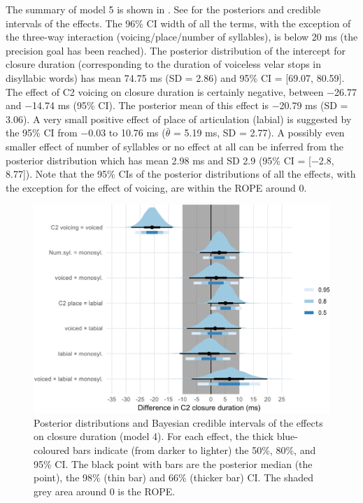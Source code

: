 \documentclass[
  12pt,
  a4paper,
]{article}
\begin{document}
The summary of model 5 is shown in . See
 for the posteriors and credible intervals of
the effects. The 96\% CI width of all the terms, with the exception of
the three-way interaction (voicing/place/number of syllables), is below
20 ms (the precision goal has been reached). The posterior distribution
of the intercept for closure duration (corresponding to the duration of
voiceless velar stops in disyllabic words) has mean 74.75 ms (SD = 2.86)
and 95\% CI = {[}69.07, 80.59{]}. The effect of C2 voicing on closure
duration is certainly negative, between −26.77 and −14.74 ms (95\% CI).
The posterior mean of this effect is −20.79 ms (SD = 3.06). A very small
positive effect of place of articulation (labial) is suggested by the
95\% CI from −0.03 to 10.76 ms (\(\bar{\theta}\) = 5.19 ms, SD = 2.77).
A possibly even smaller effect of number of syllables or no effect at
all can be inferred from the posterior distribution which has mean 2.98
ms and SD 2.9 (95\% CI = {[}−2.8, 8.77{]}). Note that the 95\% CIs of
the posterior distributions of all the effects, with the exception for
the effect of voicing, are within the ROPE around 0.

\begin{figure}
\includegraphics[width=\linewidth]{2019-english-rr_files/figure-latex/clos-5-intervals-1} \caption{Posterior distributions and Bayesian credible intervals of the effects on closure duration (model 4). For each effect, the thick blue-coloured bars indicate (from darker to lighter) the 50\%, 80\%, and 95\% CI. The black point with bars are the posterior median (the point), the 98\% (thin bar) and 66\% (thicker bar) CI. The shaded grey area around 0 is the ROPE.}\label{f:clos-5-intervals}
\end{figure}
\end{document}
